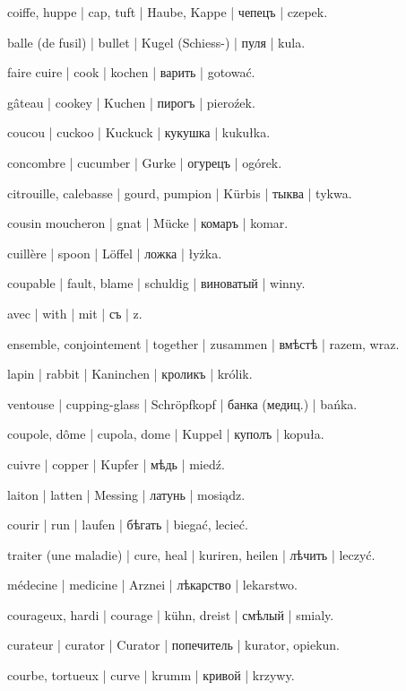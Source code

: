 \begin{outdent}{1em}
coiffe, huppe | cap, tuft | Haube, Kappe | чепецъ | czepek.

balle (de fusil) | bullet | Kugel (Schiess-) | пуля | kula.

faire cuire | cook | kochen | варить | gotować.

gâteau | cookey | Kuchen | пирогъ | pieroźek.

coucou | cuckoo | Kuckuck | кукушка | kukułka.

concombre | cucumber | Gurke | огурецъ | ogórek.

citrouille, calebasse | gourd, pumpion | Kürbis | тыква | tykwa.

cousin moucheron | gnat | Mücke | комаръ | komar.

cuillère | spoon | Löffel | ложка | łyżka.

coupable | fault, blame | schuldig | виноватый | winny.

avec | with | mit | съ | z.

\uvsubentry{}
ensemble, conjointement | together | zusammen | вмѣстѣ | razem, wraz.

lapin | rabbit | Kaninchen | кроликъ | królik.

ventouse | cupping-glass | Schröpfkopf | банка (медиц.) | bańka.

coupole, dôme | cupola, dome | Kuppel | куполъ | kopuła.

cuivre | copper | Kupfer | мѣдь | miedź.

\uvsubentry{}
laiton | latten | Messing | латунь | mosiądz.

courir | run | laufen | бѣгать | biegać, lecieć.

traiter (une maladie) | cure, heal | kuriren, heilen | лѣчить | leczyć.

\uvsubentry{}
médecine | medicine | Arznei | лѣкарство | lekarstwo.

courageux, hardi | courage | kühn, dreist | смѣлый | smialy.

curateur | curator | Curator | попечитель | kurator, opiekun.

courbe, tortueux | curve | krumm | кривой | krzywy.


\end{outdent}
